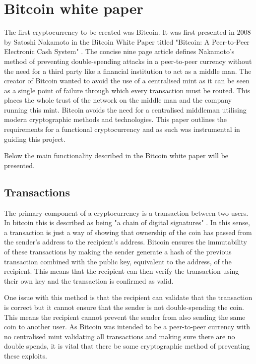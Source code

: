 \documentclass{l4proj}
\begin{document}
\section{Bitcoin white paper}
The first cryptocurrency to be created was Bitcoin. It was first presented in 2008 by Satoshi Nakamoto in the Bitcoin White Paper
titled "Bitcoin: A Peer-to-Peer Electronic Cash System" \citep{nakamoto2019bitcoin}. The concise nine page article defines Nakamoto's method of preventing
double-spending attacks in a peer-to-peer currency without the need for a third party like a financial institution to 
act as a middle man. The creator of Bitcoin wanted to avoid the use of a centralised mint as it can be seen as a single 
point of failure through which every transaction must be routed. This places the whole trust of the network on the middle 
man and the company running this mint.  Bitcoin avoids the need for a centralised middleman utilising modern cryptographic 
methods and technologies. This paper outlines the requirements for a functional cryptocurrency and as such was instrumental 
in guiding this project.

Below the main functionality described in the Bitcoin white paper will be presented.


\subsection{Transactions}
The primary component of a cryptocurrency is a transaction between two users. In bitcoin this is described as being "a
chain of digital signatures" \citep{nakamoto2019bitcoin}. In this sense, a transaction is just a way of showing that ownership of the coin has
passed from the sender's address to the recipient's address. Bitcoin ensures the immutability of these transactions
by making the sender generate a hash of the previous transaction combined with the public key, equivalent to the address,
of the recipient. This means that the recipient can then verify the transaction using their own key and the transaction
is confirmed as valid.

One issue with this method is that the recipient can validate that the transaction is correct but it cannot ensure
that the sender is not double-spending the coin. This means the recipient cannot prevent the sender from also sending the 
same coin to another user. As Bitcoin was intended to be a peer-to-peer currency with no centralised mint validating
all transactions and making sure there are no double spends, it is vital that there be some cryptographic method of
preventing these exploits.
\end{document}
